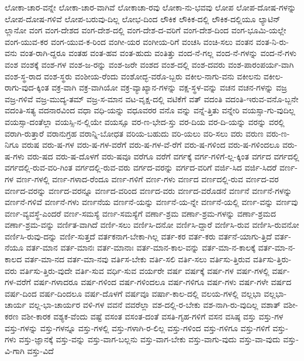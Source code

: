 {ಲೋಕಾ-ಚಾರ-ವನ್ನೇ
ಲೋಕಾ-ಚಾರ-ವಾಗಿವೆ
ಲೋಕಾಚಾ-ರವು
ಲೋಕಾ-ನು-ಭವವು
ಲೋಪ
ಲೋಪ-ದೋಷ-ಗಳನ್ನು
ಲೋಪ-ದೋಷ-ಗಳಿವೆ
ಲೋಪ-ಬರುವು-ದಿಲ್ಲ
ಲೋಭ-ದಿಂದ
ಲೌಕಿಕ
ಲೌಕಿಕ-ದಲ್ಲಿ
ಲೌಕಿಕ-ದಲ್ಲಿಯೂ
ಲ್ಯಾಟಿನ್
ಲ್ಲಾನೋ
ವಂಗ
ವಂಗ-ದೇಶದ
ವಂಗ-ದೇಶ-ದಲ್ಲಿ
ವಂಗ-ದೇಶ-ದ-ವರಿಗೆ
ವಂಗ-ದೇಶ-ದಿಂದ
ವಂಗ-ಭೂಮಿ-ಯಲ್ಲೇ
ವಂಗ-ಯುವ-ಕರ
ವಂಗ-ಯುವ-ಕ-ರಿಂದ
ವಂಗೀ-ಯರ
ವಂಗೀಯ-ರಿಗೆ
ವಂಚಸಿ
ವಂಚಿ-ಸಲು
ವಂತನ
ವಂತ-ನಿ-ರು-ವನು
ವಂತ-ರಾಗಿ-ದ್ದರೂ
ವಂತಹ
ವಂತ-ಹವ
ವಂತ-ಹುದು
ವಂತಿತ್ತು
ವಂದ-ನೆ-ಗಲ್ಲ
ವಂದ-ನೆ-ಗಳನ್ನು
ವಂದ-ನೆ-ಗಳು
ವಂಶ
ವಂಶಕ್ಕೆ
ವಂಶ-ಗಳ
ವಂಶ-ಜ-ರನ್ನು
ವಂಶ-ಜರೇ
ವಂಶದ
ವಂಶ-ದಲ್ಲಿ
ವಂಶ-ದವರು
ವಂಶ-ಪಾರಂಪರ್ಯ-ವಾಗಿ
ವಂಶ-ಸ್ಥ-ರಾದ
ವಂಶ-ಸ್ಥರು
ವಂಶೀಯ-ರೆಂದು
ವಂಶೋದ್ಭ-ವರೊ-ಬ್ಬರು
ವಕೀಲ-ನಾಗು-ವನು
ವಕೀಲನು
ವಕೀಲ-ರಾಗು-ವುದ-ಕ್ಕಿಂತ
ವಕ್ರ-ವಾಗಿ
ವಕ್ರ-ವಾಗಿಯೋ
ವಕ್ರ-ವ್ಯಾಖ್ಯಾನ-ಗಳನ್ನು
ವಕ್ಷ-ಸ್ಥಳ-ವನ್ನು
ವಚನ
ವಚನ-ಗಳನ್ನು
ವಜ್ರ
ವಜ್ರ-ಗಳಿವೆ
ವಜ್ರ-ಮುದ್ಯ-ತಮ್
ವಜ್ರ-ಸ-ಮಾನ
ವಟ-ವೃಕ್ಷ-ದಲ್ಲಿ
ವಟಿಕೆಗೆ
ವತ್
ವದಂತಿ
ವದಂತಿ-ಇರುವ-ವನೊ-ಬ್ಬನೇ
ವದಂತಿ-ಸತ್ಯ
ವದನಾರವಿಂದ
ವಧಾ
ವಧಿ-ಯನ್ನು
ವಧೂವರರ
ವನೊ
ವನ್ನು
ವನ್ನೆ-ತ್ತಿತು
ವನ್ನೇರಿ
ವಯಸ್ಸಾ-ಗು-ವುದಿಲ್ಲ
ವಯಸ್ಸಾ-ದಂತೆಲ್ಲಾ
ವಯಸ್ಸಿ-ನ-ಲ್ಲಿಯೇ
ವಯಸ್ಸೂ
ವರ-ಣ-ಭೇದ-ಸ್ತು
ವರ-ದಿಯ
ವರ-ದಿ-ಯನ್ನು
ವರನ್ನು
ವರಲ್ಲಿ
ವರಾಗಿ-ರುತ್ತಾರೆ
ವರಾನುಗ್ರಹ
ವರಾನ್ನಿ-ಬೋಧತ
ವರಿಯ-ಬಹುದು
ವರಿ-ಯಲು
ವರಿ-ಸಲು
ವರು
ವರುಣ
ವರು-ಣ-ನಿಗೂ
ವರುಷ
ವರು-ಷ-ಗಳ
ವರು-ಷ-ಗಳ-ವರೆಗೆ
ವರು-ಷ-ಗಳ-ವೆ-ರೆಗೆ
ವರು-ಷ-ಗಳಿಂದ
ವರು-ಷ-ಗಳಿಂದಲೂ
ವರು-ಷ-ಗಳು
ವರು-ಷದ
ವರು-ಷ-ದೊಳಗೆ
ವರು-ಷವೂ
ವರೆಗೂ
ವರೆಗೆ
ವರ್ಗಕ್ಕೆ
ವರ್ಗ-ಗಳಿಗೆ-ಲ್ಲ-ಕ್ಕಿಂತ
ವರ್ಗದ
ವರ್ಗದಲ್ಲಿ
ವರ್ಗದಲ್ಲಿ-ರುವ-ವರಿ-ಗಿಂತ
ವರ್ಗದಲ್ಲಿ-ರುವ-ವರು
ವರ್ಗದ-ವರನ್ನು
ವರ್ಗದ-ವರಿಗೆ
ವರ್ಜಿ-ಸಿದ
ವರ್ಜಿ-ಸಿದರೆ
ವರ್ಣ-ಗಳ
ವರ್ಣ-ಗಳಲ್ಲಿ
ವರ್ಣ-ಗಳಾದ-ರೆಂದೂ
ವರ್ಣ-ಗಳಿಗೆ
ವರ್ಣ-ಗಳು
ವರ್ಣದ
ವರ್ಣದಲ್ಲಿ-ರುವ
ವರ್ಣದ-ವರ
ವರ್ಣದ-ವರನ್ನು
ವರ್ಣದ-ವರನ್ನೂ
ವರ್ಣದ-ವರಿಂದ
ವರ್ಣದ-ವರು
ವರ್ಣದ-ವರೊಡನೆ
ವರ್ಣನೆ
ವರ್ಣನೆ-ಗಳನ್ನು
ವರ್ಣನೆ-ಗಳಿವೆ
ವರ್ಣನೆ-ಗಳು
ವರ್ಣನೆಯ
ವರ್ಣನೆ-ಯನ್ನು
ವರ್ಣನೆ-ಯ-ನ್ನೇ
ವರ್ಣನೆ-ಯಲ್ಲಿ
ವರ್ಣ-ವನ್ನು
ವರ್ಣವು
ವರ್ಣ-ವ್ಯವಸ್ಥೆ-ಎಂದರೆ
ವರ್ಣ-ಸಮಸ್ಯೆ
ವರ್ಣ-ಸಮಸ್ಯೆಗೆ
ವರ್ಣಾ-ಶ್ರಮ
ವರ್ಣಾ-ಶ್ರಮ-ಗಳನ್ನು
ವರ್ಣಾ-ಶ್ರಮದ
ವರ್ಣಾ-ಶ್ರಮ-ವನ್ನು
ವರ್ಣಿತ-ವಾಗಿದೆ
ವರ್ಣಿ-ಸಲು
ವರ್ಣಿಸಿ-ದನೋ
ವರ್ಣಿಸಿ-ದ್ದಾರೆ
ವರ್ಣಿಸಿ-ರುವ
ವರ್ಣಿಸಿ-ರುವನೋ
ವರ್ಣಿಸಿ-ರುವು-ದನ್ನು
ವರ್ಣಿ-ಸುತ್ತದೆ
ವರ್ತಕನಾಗ-ಬೇಕಾ-ಗಿಲ್ಲ
ವರ್ತ-ಕರ
ವರ್ತ-ಕರು
ವರ್ತನೆ-ಯಾಗು-ತ್ತಿದೆ
ವರ್ತ-ನೆಯೂ
ವರ್ತ-ಮಾನ
ವರ್ತ-ಮಾನಃ
ವರ್ತ-ಮಾನಾಃ
ವರ್ತ-ಮಾನ-ಕಾಲ-ವನ್ನು
ವರ್ತ-ಮಾ-ನ-ಕಾಲಕ್ಕೆ
ವರ್ತ-ಮಾ-ನ-ಕಾಲದ
ವರ್ತ-ಮಾ-ನದ
ವರ್ತ-ಮಾ-ನವು
ವರ್ತಿಸ-ಬೇಕು
ವರ್ತಿ-ಸಲಿ
ವರ್ತಿ-ಸಲು
ವರ್ತಿಸು-ತ್ತಿರುವ
ವರ್ತಿಸು-ತ್ತಿರು-ವರು
ವರ್ತಿಸು-ತ್ತಿರು-ವುದೇ
ವರ್ತಿ-ಸುವ
ವರ್ಧಿ-ಸುವ
ವರ್ಯರೇ
ವರ್ಷ
ವರ್ಷಕ್ಕೆ
ವರ್ಷ-ಗಳ
ವರ್ಷ-ಗಳಲ್ಲಿ
ವರ್ಷ-ಗಳ-ವರೆಗೆ
ವರ್ಷ-ಗಳಾದರೂ
ವರ್ಷ-ಗಳಿಂದ
ವರ್ಷ-ಗಳಿಂದಲೂ
ವರ್ಷ-ಗಳಿಗೂ
ವರ್ಷ-ಗಳು
ವರ್ಷ-ಗಳೇ
ವರ್ಷದ
ವರ್ಷ-ದಿಂದ
ವರ್ಷ-ದಿಂದಲೂ
ವರ್ಷ-ದೊಳಗೆ
ವರ್ಷವೂ
ವರ್ಷಾ-ಕಾಲ-ದಲ್ಲಿ
ವಲಯ-ಗಳಲ್ಲಿ
ವಲ್ಲಭಾ
ವಲ್ಲಭಾ-ಚಾರ್ಯ
ವಲ್ಲ-ಭಾ-ಚಾರ್ಯರ
ವಳಿ-ಗಳ
ವವನೆ
ವವರೆಲ್ಲಾ
ವಶ-ದಲ್ಲಿ-ರ-ಬೇಕು
ವಶ-ನಾಗಿ-ರು-ವುದಿಲ್ಲ
ವಶಾತ್
ವಶೀ-ಕರಣ
ವಶೀ-ಕಾರಕ
ವಶ್ಯಕ-ವೆಂದು
ವಷ್ಟೆ
ವಸಂತ
ವಸಂತ-ದಂತೆ
ವಸತಿ-ಗೃಹ-ಗಳಿಗೆ
ವಸನ
ವಸಿಷ್ಠ
ವಸ್ತು
ವಸ್ತು-ಗಳ
ವಸ್ತು-ಗಳನ್ನು
ವಸ್ತು-ಗಳನ್ನೂ
ವಸ್ತು-ಗಳಲ್ಲಿ
ವಸ್ತು-ಗಳಾಗಿ-ರ-ಲಿಲ್ಲ
ವಸ್ತು-ಗಳಿಂದ
ವಸ್ತು-ಗಳಿಗೂ
ವಸ್ತು-ಗಳಿಗೆ
ವಸ್ತು-ಗಳು
ವಸ್ತು-ಜ್ಞಾನಕ್ಕೆ
ವಸ್ತು-ವನ್ನು
ವಸ್ತು-ವಾಗ-ಬಲ್ಲನು
ವಸ್ತು-ವಾಗ-ಬೇಕು
ವಸ್ತು-ವಾಗು-ವುದು
ವಸ್ತು-ವಾ-ವುದು
ವಸ್ತು-ವಿ-ಗಾಗಿ
ವಸ್ತು-ವಿದೆ
}
